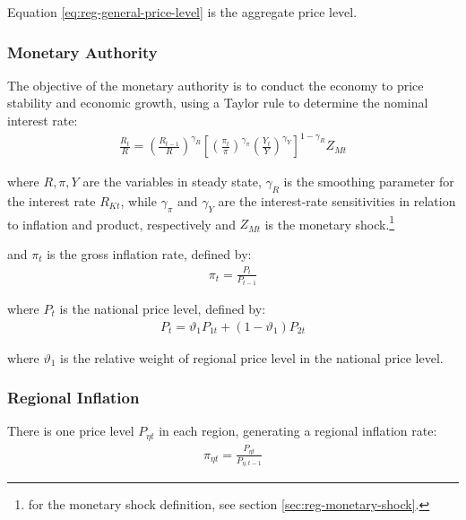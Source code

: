 \documentclass[
thesis.tex
]{subfiles}
\begin{document}
Equation \ref{eq:reg-general-price-level} is the aggregate price level.


\subsubsection{Monetary Authority}

The objective of the monetary authority is to conduct the economy to price stability and economic growth, using a Taylor rule \cite{taylor_discretion_1993} to determine the nominal interest rate:
\begin{align}
	\label{eq:reg-monetary-policy}
	\frac{R_{t}}{R} =
	\left( \frac{R_{t-1}}{R} \right)^{\gamma_R}  \left[
	\left( \frac{\pi_t}{\pi} \right)^{\gamma_\pi}
	\left( \frac{Y_t}{Y} \right)^{\gamma_Y} \right]^{1-\gamma_R} Z_{Mt}
\end{align}

where $R, \pi, Y$ are the variables in steady state, $\gamma_R$ is the smoothing parameter for the interest rate $R_{Kt}$, while $\gamma_\pi$ and $\gamma_Y$ are the interest-rate sensitivities in relation to inflation and product, respectively and $Z_{Mt}$ is the monetary shock.\footnote{for the monetary shock definition, see section \ref{sec:reg-monetary-shock}.}

and $\pi_t$ is the gross inflation rate, defined by:
\begin{align}
	\pi_t = \frac{P_t}{P_{t-1}}
	\label{eq:reg-gross-inflation-rate}
\end{align}

where $P_t$ is the national price level, defined by:
\begin{align}
	P_t = \vartheta_1 P_{1 t} + (1 -\vartheta_1) P_{2 t}
	\label{eq:national-price-level}
\end{align}

where $\vartheta_1$ is the relative weight of regional price level in the national price level.

\subsubsection*{Regional Inflation}

There is one price level $P_{\eta t}$ in each region, generating a regional inflation rate:
\begin{align}
	\pi_{\eta t} = \frac{P_{\eta t}}{P_{\eta, t-1}} \label{eq:regional-inflation}
\end{align}
\end{document}
